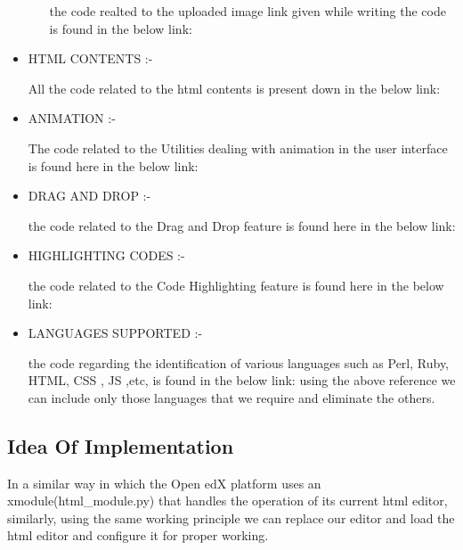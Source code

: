 \begin{itemize}
\begin{enumerate}
\begin{center}  the code realted to the uploaded image link given while writing the code is found in
the below link: 
\end{center}
\end{enumerate}
\item HTML CONTENTS :- 
\begin{center}
All the code related to the html contents is present down in the below link: 
\end{center}
\item ANIMATION :- 
\begin{center}
The code related to the Utilities dealing with animation in the user interface is found
here in the below link: 
\end{center}
\item DRAG AND DROP :- 
\begin{center}
the code related to the Drag and Drop feature is found here in the below link: 
\end{center}
\item HIGHLIGHTING CODES :- 
\begin{center}
the code related to the Code Highlighting feature is found here in the below link: 
\end{center}
\item LANGUAGES SUPPORTED :- 
\begin{center}
the code regarding the identification of various languages such as Perl, Ruby,
HTML, CSS , JS ,etc, is found in the below link: 
\newline  using the above reference we can include only those languages that we require and
eliminate the others.
\end{center}
\end{itemize}
\subsection{Idea Of Implementation}
In a similar way in which the Open edX platform uses an xmodule(html\_module.py) that
handles the operation of its current html editor, similarly, using the same working principle
we can replace our editor and load the html editor and configure it for proper working.

